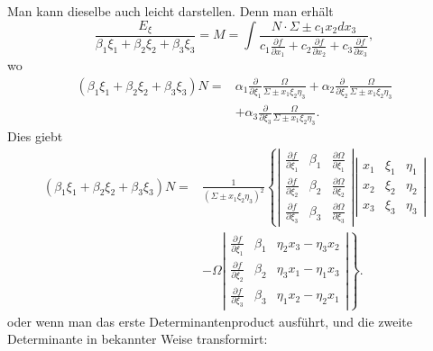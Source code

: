 \documentclass[10pt]{article}
\begin{document}
Man kann dieselbe auch leicht darstellen. Denn man erhält
\[
\frac{E_\xi}{\beta_1\xi_1+\beta_2\xi_2+\beta_3\xi_3}
=M=\int\frac{N\cdot\Sigma\pm c_1x_2dx_3}{c_1\frac{\partial f}{\partial x_1}+c_2\frac{\partial f}{\partial x_2}+c_3\frac{\partial f}{\partial x_3}},
\]
wo
\[
\begin{aligned}
(\beta_1\xi_1+\beta_2\xi_2+\beta_3\xi_3)N
={}&\alpha_1\frac{\partial}{\partial \xi_1}\frac{\Omega}{\Sigma\pm x_1\xi_2\eta_3}
+\alpha_2\frac{\partial}{\partial \xi_2}\frac{\Omega}{\Sigma\pm x_1\xi_2\eta_3}\\
&+\alpha_3\frac{\partial}{\partial \xi_3}\frac{\Omega}{\Sigma\pm x_1\xi_2\eta_3}.
\end{aligned}
\]
Dies giebt
\[
\begin{aligned}
(\beta_1\xi_1+\beta_2\xi_2+\beta_3\xi_3)N
={}&\frac{1}{(\Sigma\pm x_1\xi_2\eta_3)^2}
\left\{
\left|\begin{array}{ccc}
\frac{\partial f}{\partial \xi_1}&\beta_1&\frac{\partial\Omega}{\partial \xi_1}\\
\frac{\partial f}{\partial \xi_2}&\beta_2&\frac{\partial\Omega}{\partial \xi_2}\\
\frac{\partial f}{\partial \xi_3}&\beta_3&\frac{\partial\Omega}{\partial \xi_3}
\end{array}\right|
\left|\begin{array}{ccc}
x_1&\xi_1&\eta_1\\
x_2&\xi_2&\eta_2\\
x_3&\xi_3&\eta_3
\end{array}\right|
\right.\\
&\left.
-\Omega
\left|\begin{array}{ccc}
\frac{\partial f}{\partial \xi_1}&\beta_1&\eta_2x_3-\eta_3x_2\\
\frac{\partial f}{\partial \xi_2}&\beta_2&\eta_3x_1-\eta_1x_3\\
\frac{\partial f}{\partial \xi_3}&\beta_3&\eta_1x_2-\eta_2x_1
\end{array}\right|
\right\}.
\end{aligned}
\]
oder wenn man das erste Determinantenproduct ausführt, und die zweite Determinante in bekannter Weise transformirt:
\end{document}
